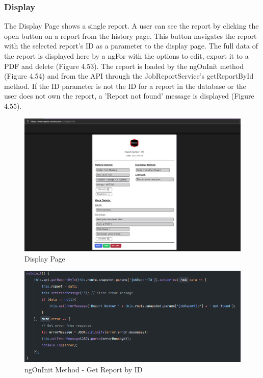 \subsubsection{Display}
The Display Page shows a single report. A user can see the report by clicking the open button on a report from the history page. This button navigates the report with the selected report's ID as a parameter to the display page. The full data of the report is displayed here by a ngFor with the options to edit, export it to a PDF and delete (Figure 4.53). The report is loaded by the ngOnInit method (Figure 4.54) and from the API through the JobReportService's getReportById method. If the ID parameter is not the ID for a report in the database or the user does not own the report, a 'Report not found' message is displayed (Figure 4.55).  

\begin{figure}[H]
    \caption{Display Page}
    \label{image:displayPage}
    \centering
    \includegraphics[width=1.0\textwidth]{images/repota/UI/display-page.png}
\end{figure}

\begin{figure}[H]
    \caption{ngOnInit Method - Get Report by ID}
    \label{image:ng_reportbyID}
    \centering
    \includegraphics[width=1.0\textwidth]{images/repota/report_pages/display.png}
\end{figure}

